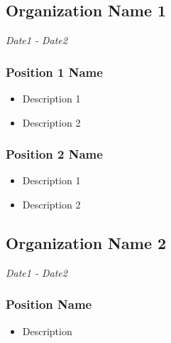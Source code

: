 \documentclass{article}
\renewcommand{\date}[1]{
    \hfill{\normalsize\textit{#1}}
}
\begin{document}
        \subsection{Organization Name 1}\date{Date1 - Date2}
            \subsubsection{Position 1 Name}
                \begin{itemize}
                    \item Description 1
                    \item Description 2 
                \end{itemize}
            \subsubsection{Position 2 Name} %
                \begin{itemize}
                    \item Description 1
                    \item Description 2
                \end{itemize}
        \subsection{Organization Name 2}\date{Date1 - Date2}
            \subsubsection{Position Name}
                \begin{itemize}
                    \item Description
                \end{itemize}
\end{document}
